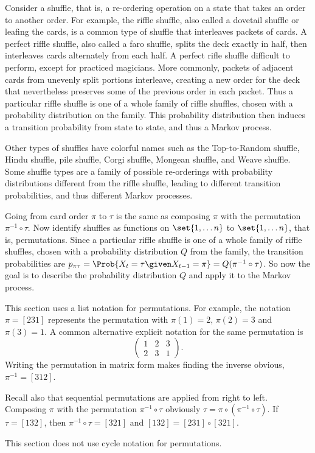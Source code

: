 \documentclass[12pt]{article}
\begin{document}
Consider a shuffle, that is, a re-ordering operation on a state that
takes an order to another order.  For example, the riffle shuffle, also
called a dovetail shuffle or leafing the cards, is a common type of
shuffle that interleaves packets of cards.  A perfect riffle shuffle,
also called a faro shuffle, splits the deck exactly in half, then
interleaves cards alternately from each half.  A perfect rifle shuffle
difficult to perform, except for practiced magicians.  More commonly,
packets of adjacent cards from unevenly split portions interleave,
creating a new order for the deck that nevertheless preserves some of
the previous order in each packet.  Thus a particular riffle shuffle is
one of a whole family of riffle shuffles, chosen with a probability
distribution on the family.  This probability distribution then induces
a transition probability from state to state, and thus a Markov process.

Other types of shuffles have colorful names such as the Top-to-Random
shuffle, Hindu shuffle, pile shuffle, Corgi shuffle, Mongean shuffle,
and Weave shuffle. Some shuffle types are a family of possible
re-orderings with probability distributions different from the riffle
shuffle, leading to different transition probabilities, and thus
different Markov processes.

Going from card order \( \pi \) to \( \tau \) is the same as composing \(
\pi \) with the permutation \( \pi^{-1} \circ \tau \).  Now identify
shuffles as functions on \( \set{1, \dots n} \) to \( \set{1, \dots n} \),
that is, permutations.%
Since a particular riffle shuffle is one of a whole family of riffle
shuffles, chosen with a probability distribution \( Q \) from the
family, the transition probabilities are \( p_{\pi \tau} = \Prob{X_t =
\tau \given X_{t-1} = \pi} = Q(\pi^{-1} \circ \tau) \).  So now the goal
is to describe the probability distribution \( Q \) and apply it to the
Markov process.

\begin{remark}
    This section uses a list notation for permutations.  For example,
    the notation \( \pi = [231] \) represents the permutation with \(
    \pi(1) = 2 \), \( \pi(2) = 3 \) and \( \pi(3) = 1 \).  A common
    alternative explicit notation for the same permutation is
    \[
        \begin{pmatrix}
            1 & 2 & 3 \\
            2 & 3 & 1
        \end{pmatrix}
        .
    \] Writing the permutation in matrix form makes finding the inverse
    obvious, \( \pi^{-1} = [312] \).

    Recall also that sequential permutations are applied from right to
    left.  Composing \( \pi \) with the permutation \( \pi^{-1} \circ
    \tau \) obviously \( \tau = \pi \circ (\pi^{-1} \circ \tau) \). If \(
    \tau = [132] \), then \( \pi^{-1} \circ \tau = [321] \) and \( [132]
    = [231] \circ [321] \).

    This section does not use cycle notation for permutations.
\end{remark}
\end{document}
